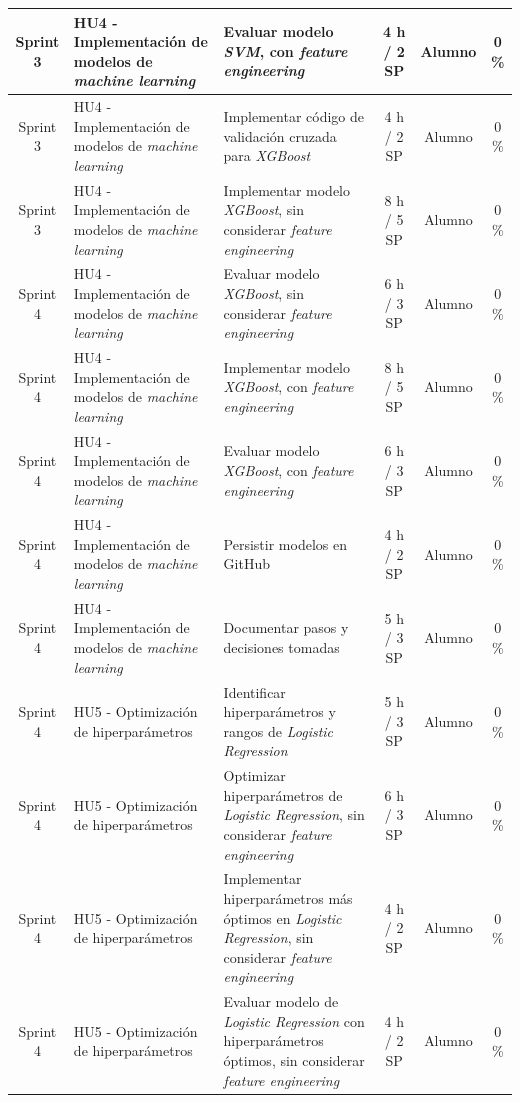 \documentclass[
11pt, %
]{charter}
\begin{document}
\begin{xltabular}{\linewidth}{@{}|c|X|X|c|c|c|@{}}
Sprint 3 & HU4 - Implementación de modelos de \textit{machine learning} & Evaluar modelo \textit{SVM}, con \textit{feature engineering}  & 4 h / 2 SP & Alumno & 0 \%\\ \hline
Sprint 3 & HU4 - Implementación de modelos de \textit{machine learning} & Implementar código de validación cruzada para \textit{XGBoost}  & 4 h / 2 SP & Alumno & 0 \%\\ \hline
Sprint 3 & HU4 - Implementación de modelos de \textit{machine learning} & Implementar modelo \textit{XGBoost}, sin considerar \textit{feature engineering}  & 8 h / 5 SP & Alumno & 0 \%\\ \hline
Sprint 4 & HU4 - Implementación de modelos de \textit{machine learning} & Evaluar modelo \textit{XGBoost}, sin considerar \textit{feature engineering}  & 6 h / 3 SP & Alumno & 0 \%\\ \hline
Sprint 4 & HU4 - Implementación de modelos de \textit{machine learning} & Implementar modelo \textit{XGBoost}, con \textit{feature engineering}  & 8 h / 5 SP & Alumno & 0 \%\\ \hline
Sprint 4 & HU4 - Implementación de modelos de \textit{machine learning} & Evaluar modelo \textit{XGBoost}, con \textit{feature engineering}  & 6 h / 3 SP & Alumno & 0 \%\\ \hline
Sprint 4 & HU4 - Implementación de modelos de \textit{machine learning} & Persistir modelos en GitHub  & 4 h / 2 SP & Alumno & 0 \%\\ \hline
Sprint 4 & HU4 - Implementación de modelos de \textit{machine learning} & Documentar pasos y decisiones tomadas  & 5 h / 3 SP & Alumno & 0 \%\\ \hline
Sprint 4 & HU5 - Optimización de hiperparámetros & Identificar hiperparámetros y rangos de \textit{Logistic Regression}  & 5 h / 3 SP & Alumno & 0 \%\\ \hline
Sprint 4 & HU5 - Optimización de hiperparámetros & Optimizar hiperparámetros de \textit{Logistic Regression}, sin considerar \textit{feature engineering}  & 6 h / 3 SP & Alumno & 0 \% \\ \hline
Sprint 4 & HU5 - Optimización de hiperparámetros & Implementar hiperparámetros más óptimos en \textit{Logistic Regression}, sin considerar \textit{feature engineering} & 4 h / 2 SP & Alumno & 0 \% \\ \hline
Sprint 4 & HU5 - Optimización de hiperparámetros & Evaluar modelo de \textit{Logistic Regression} con hiperparámetros óptimos, sin considerar \textit{feature engineering}  & 4 h / 2 SP & Alumno & 0 \% \\ \hline

\end{xltabular}
\end{document}
